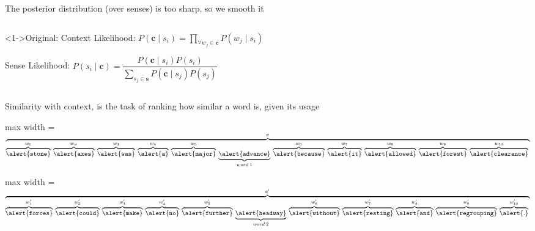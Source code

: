 \documentclass[dvipsnames]{beamer}
\newcommand{\fitmath}[1]{
	\begin{adjustbox}{max width = \textwidth}	
		$\displaystyle
		#1
		$
	\end{adjustbox}
}
\renewcommand{\c}{\mathbf{c}}
\newcommand{\s}{\mathbf{s}}
\newcommand{\ubraceword}[2]{\underbrace{\mathtt{\alert{#1}}}_{#2}\:}
\newcommand{\obraceword}[2]{\overbrace{\mathtt{\alert{#1}}}^{#2}\:}
\begin{document}
\begin{frame}{The posterior distribution (over senses) is too sharp, so we smooth it}
	\vspace{-1em}
	\begin{columns}[T]
		\begin{column}{0.5\textwidth}
			\begin{block}<1->{Original:}
				\vspace{1em}
				\alert{Context Likelihood:}
				$\displaystyle%
				P(\c \mid s_{i})=\prod_{\forall w_{j}\in\c}P(w_{j} \mid s_{i})
				$
							
				\vspace{1em}
				\alert{Sense Likelihood:}
				$\displaystyle%
				P(s_{i} \mid \c) =
				\dfrac{P(\c \mid s_{i})P(s_{i})}
				{\sum_{s_{j}\in\s} P(\c \mid s_{j})P(s_{j})}
				$
						
			\end{block}
		\end{column}
		
		
		\begin{column}{0.5\textwidth}
			
		\end{column}		
	\end{columns}
	\vspace{0em}
	\sentexample
\end{frame}



\newcommand{\simsentone}{%
	\fitmath{
		\overbrace{
			\obraceword{stone}{w_1}
			\obraceword{axes}{w_w}
			\obraceword{was}{w_3}
			\obraceword{a}{w_4}
			\obraceword{major}{w_5}
			\ubraceword{advance}{word\: 1}
			\obraceword{because}{w_6}
			\obraceword{it}{w_7}
			\obraceword{allowed}{w_8}
			\obraceword{forest}{w_9}
			\obraceword{clearance}{w_{10}}
		}^{\c}%
	}
}

\newcommand{\simsenttwo}{%
	\fitmath{
			\overbrace{
			\obraceword{forces}{w_1^\prime}
			\obraceword{could}{w_2^\prime}
			\obraceword{make}{w_3^\prime}
			\obraceword{no}{w_4^\prime}
			\obraceword{further}{w_5^\prime}
			\ubraceword{headway}{word\: 2}
			\obraceword{without}{w_6^\prime}
			\obraceword{resting}{w_7^\prime}
			\obraceword{and}{w_8^\prime}
			\obraceword{regrouping}{w_9^\prime}
			\obraceword{.}{w_{10}^\prime}
		}^{\c^\prime}%
	}}

\begin{frame}{Similarity with context, is the task of ranking how similar a word is, given its usage}
	
	\vfill
	\simsentone
	\vfill
	\simsenttwo
	\vfill

\end{frame}
\end{document}
